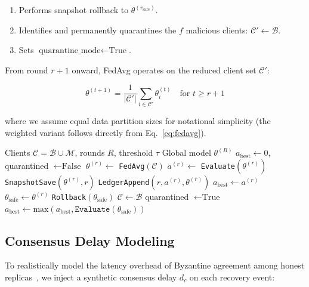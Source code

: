 \documentclass[conference]{IEEEtran}
\newcommand{\B}{\mathcal{B}}
\newcommand{\M}{\mathcal{M}}
\begin{document}
\begin{enumerate}
    \item Performs snapshot rollback to $\theta^{(r_{\text{safe}})}$.
    \item Identifies and permanently quarantines the $f$ malicious clients: $\mathcal{C}' \leftarrow \B$.
    \item Sets $\text{quarantine\_mode} \leftarrow \text{True}$.
\end{enumerate}

From round $r+1$ onward, FedAvg operates on the reduced client set $\mathcal{C}'$:

\begin{equation}
\theta^{(t+1)} = \frac{1}{|\mathcal{C}'|} \sum_{i \in \mathcal{C}'} \theta_i^{(t)} \quad \text{for } t \geq r+1
\label{eq:reduced}
\end{equation}

where we assume equal data partition sizes for notational simplicity (the weighted variant follows directly from Eq.~\ref{eq:fedavg}).

\begin{algorithm}[t]
\caption{RFL-Block: Self-Healing FL with Quarantine}
\label{alg:quarantine}
\begin{algorithmic}[1]
\Require Clients $\mathcal{C} = \B \cup \M$, rounds $R$, threshold $\tau$
\Ensure Global model $\theta^{(R)}$
\State $a_{\text{best}} \gets 0$, quarantined $\gets \text{False}$
    \State $\theta^{(r)} \gets$ \texttt{FedAvg}$(\mathcal{C})$
    \State $a^{(r)} \gets$ \texttt{Evaluate}$(\theta^{(r)})$
    \State \texttt{SnapshotSave}$(\theta^{(r)}, r)$
    \State \texttt{LedgerAppend}$(r, a^{(r)}, \theta^{(r)})$
        \State $a_{\text{best}} \gets a^{(r)}$
        \State $\theta_{\text{safe}} \gets \theta^{(r)}$
    \EndIf
        \State \texttt{Rollback}$(\theta_{\text{safe}})$
        \State $\mathcal{C} \gets \B$ 
        \State quarantined $\gets \text{True}$
        \State $a_{\text{best}} \gets \text{max}(a_{\text{best}}, \texttt{Evaluate}(\theta_{\text{safe}}))$
    \EndIf
\EndFor
\end{algorithmic}
\end{algorithm}

\subsection{Consensus Delay Modeling}
To realistically model the latency overhead of Byzantine agreement among honest replicas~\cite{kotla2007zzyzx}, we inject a synthetic consensus delay $d_c$ on each recovery event:
\end{document}
